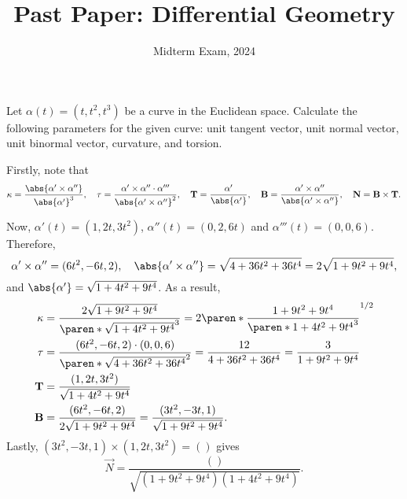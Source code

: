 \documentclass[11pt]{penrose}
\title{Past Paper: Differential Geometry}
\subtitle{Midterm Exam, 2024}
\begin{document}
\maketitle
\warningtext

\begin{problem}{1}
    Let $\alpha(t) = (t, t^2, t^3)$ be a curve in the Euclidean space. Calculate the following parameters for the given curve: unit tangent vector, unit normal vector, unit binormal vector, curvature, and torsion.

    \solution Firstly, note that
    \begin{equation*}
        \kappa = \frac{\abs{\alpha' \times \alpha''}}{\abs{\alpha'}^3},\quad
        \tau = \frac{\alpha' \times \alpha'' \cdot \alpha'''}{\abs{\alpha' \times \alpha''}^2},\quad
        \vec{T} = \frac{\alpha'}{\abs{\alpha'}},\quad
        \vec{B} = \frac{\alpha' \times \alpha''}{\abs{\alpha' \times \alpha''}},\quad
        \vec{N} = \vec{B} \times \vec{T}.
    \end{equation*}

    Now, $\alpha'(t) = (1, 2t, 3t^2)$, $\alpha''(t) = (0, 2, 6t)$ and $\alpha'''(t) = (0, 0, 6)$. Therefore,
    \begin{equation*}
        \alpha' \times \alpha'' = (6t^2, -6t, 2),\quad
        \abs{\alpha' \times \alpha''} = \sqrt{4 + 36t^2 + 36t^4} = 2\sqrt{1 + 9t^2 + 9t^4},
    \end{equation*}
    and $\abs{\alpha'} = \sqrt{1 + 4t^2 + 9t^4}$. As a result,
    \begin{align*}
        \kappa &= \frac{2\sqrt{1 + 9t^2 + 9t^4}}{\paren*{\sqrt{1 + 4t^2 + 9t^4}}^3} = 2 \paren*{\frac{1 + 9t^2 + 9t^4}{\paren*{1 + 4t^2 + 9t^4}^3}}^{1/2}\\
        \tau &= \frac{(6t^2, -6t, 2) \cdot (0,0,6)}{\paren*{\sqrt{4 + 36t^2 + 36t^4}}^2} = \frac{12}{4 + 36t^2 + 36t^4} = \frac{3}{1 + 9t^2 + 9t^4}\\
        \vec{T} &= \frac{(1, 2t, 3t^2)}{\sqrt{1 + 4t^2 + 9t^4}}\\
        \vec{B} &= \frac{(6t^2, -6t, 2)}{2\sqrt{1 + 9t^2 + 9t^4}} = \frac{(3t^2, -3t, 1)}{\sqrt{1 + 9t^2 + 9t^4}}.
    \end{align*}
    Lastly, $(3t^2, -3t, 1) \times (1, 2t, 3t^2) = ()$ gives
    \begin{equation*}
        \vec{N} = \frac{()}{\sqrt{(1 + 9t^2 + 9t^4) (1 + 4t^2 + 9t^4)}}.
    \end{equation*}
\end{problem}
\end{document}
